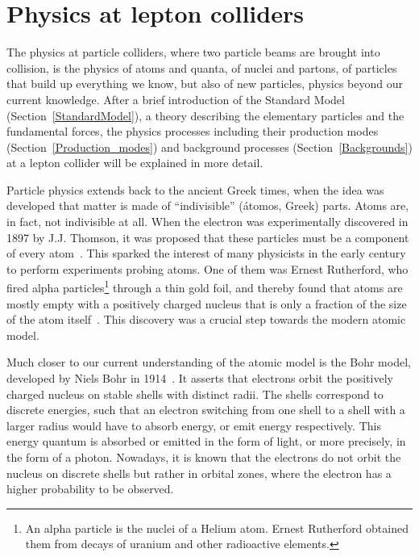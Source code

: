\chapter{Physics at lepton colliders}
\label{Lepton_Physics}
\begin{chapterabstract}
The physics at particle colliders, where two particle beams are brought into collision, is the physics of atoms and quanta, of nuclei and partons, of particles that build up everything we know, but also of new particles, physics beyond our current knowledge.
After a brief introduction of the Standard Model (Section~\ref{StandardModel}), a theory describing the elementary particles and the fundamental forces, the physics processes including their production modes (Section~\ref{Production_modes}) and background processes (Section~\ref{Backgrounds}) at a lepton collider will be explained in more detail.
\end{chapterabstract}
\vspace*{0.5cm}\newline 
\noindent
Particle physics extends back to the ancient Greek times, when the idea was developed that matter is made of ``indivisible'' (\'atomos, Greek) parts.
Atoms are, in fact, not indivisible at all.
When the electron was experimentally discovered in 1897 by J.J. Thomson, it was proposed that these particles must be a component of every atom~\cite[p. 13ff]{Griffiths}.
This sparked the interest of many physicists in the early  century to perform experiments probing atoms.
One of them was Ernest Rutherford, who fired alpha particles\footnote{An alpha particle is the nuclei of a Helium atom. Ernest Rutherford obtained them from decays of uranium and other radioactive elements.} through a thin gold foil, and thereby found that atoms are mostly empty with a positively charged nucleus that is only a fraction of the size of the atom itself~\cite{GoldFoil}.
This discovery was a crucial step towards the modern atomic model.

Much closer to our current understanding of the atomic model is the Bohr model, developed by Niels Bohr in 1914~\cite[p. 15]{Griffiths}.
It asserts that electrons orbit the positively charged nucleus on stable shells with distinct radii.
The shells correspond to discrete energies, such that an electron switching from one shell to a shell with a larger radius would have to absorb energy, or emit energy respectively.
This energy quantum is absorbed or emitted in the form of light, or more precisely, in the form of a photon.
Nowadays, it is known that the electrons do not orbit the nucleus on discrete shells but rather in orbital zones, where the electron has a higher probability to be observed.

